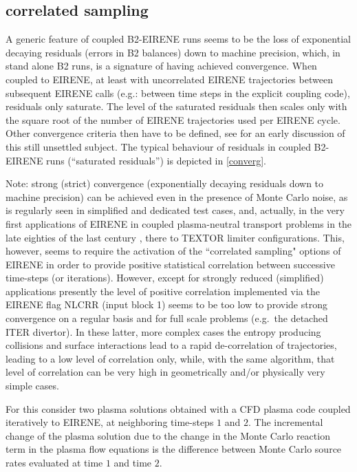 \subsection{correlated sampling}

A generic feature of coupled B2-EIRENE runs seems to be the loss of exponential
decaying residuals (errors in B2 balances) down to machine precision, which, in
stand alone B2 runs, is a signature of having achieved convergence.
When coupled to EIRENE, at least with uncorrelated EIRENE trajectories between
subsequent EIRENE calls (e.g.: between time steps in the explicit coupling
code), residuals only saturate.
The level of the saturated residuals then scales only with the square root of
the number of EIRENE trajectories used per EIRENE cycle.
Other convergence criteria then have to be defined, see \cite{kn:Maddison94}
for an early discussion of this still unsettled subject.
The typical behaviour of residuals in coupled B2-EIRENE runs (``saturated
residuals'') is depicted in \cref{converg}.

Note:  strong (strict) convergence (exponentially decaying residuals down to
machine precision) can be achieved even in the presence of Monte Carlo noise,
as is regularly seen in simplified and dedicated test cases, and, actually, in
the very first applications of EIRENE in coupled plasma-neutral transport
problems in the late eighties of the last century \cite{kn:Gerhauser88a}, there
to \ac{TEXTOR} limiter configurations.
This, however, seems to require the activation of the ``correlated sampling"
options of EIRENE in order to provide positive statistical correlation between
successive time-steps (or iterations).
However, except for strongly reduced (simplified) applications presently the
level of positive correlation implemented via the EIRENE flag NLCRR (input
block 1) seems to be too low  to provide strong convergence on a regular basis
and for full scale problems (e.g.\ the detached ITER divertor).
In these latter, more complex cases the entropy producing collisions and
surface interactions lead to a rapid de-correlation of trajectories, leading to
a low level of correlation only, while, with the same algorithm, that level of
correlation can be very high in geometrically and/or physically very simple
cases.

\medskip

For this consider two plasma solutions obtained with a \ac{CFD} plasma code
coupled iteratively to EIRENE, at neighboring time-steps $1$ and $2$.
The incremental change of the plasma solution due to the change in the Monte
Carlo reaction term in the plasma flow equations is the difference between
Monte Carlo source rates evaluated at time $1$ and time $2$.

